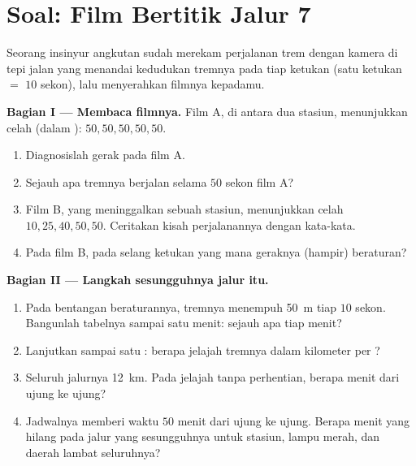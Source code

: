 \section{Soal: Film Bertitik Jalur 7}

\begin{problem}\label{pb:g6:describing-motion:1}
Seorang insinyur angkutan sudah merekam perjalanan trem dengan kamera
di tepi jalan yang menandai kedudukan tremnya pada tiap ketukan (satu
ketukan $=$ $10$ sekon), lalu menyerahkan filmnya kepadamu.

\medskip\noindent\textbf{Bagian I --- Membaca filmnya.}
Film A, di antara dua stasiun, menunjukkan celah (dalam ):
$50, 50, 50, 50, 50$.
\begin{enumerate}
  \item Diagnosislah gerak pada film A.
  \item Sejauh apa tremnya berjalan selama $50$ sekon film A?
  \item Film B, yang meninggalkan sebuah stasiun, menunjukkan celah
        $10, 25, 40, 50, 50$. Ceritakan kisah perjalanannya dengan
        kata-kata.
  \item Pada film B, pada selang ketukan yang mana geraknya (hampir)
        beraturan?
\end{enumerate}

\medskip\noindent\textbf{Bagian II --- Langkah sesungguhnya jalur itu.}
\begin{enumerate}[resume]
  \item Pada bentangan beraturannya, tremnya menempuh \qty{50}{m}
        tiap $10$ sekon. Bangunlah tabelnya sampai satu menit: sejauh
        apa tiap menit?
  \item Lanjutkan sampai satu : berapa  jelajah tremnya
        dalam kilometer per ?
  \item Seluruh jalurnya \qty{12}{km}. Pada  jelajah tanpa
        perhentian, berapa menit dari ujung ke ujung?
  \item Jadwalnya memberi waktu $50$ menit dari ujung ke ujung.
        Berapa menit yang hilang pada jalur yang sesungguhnya untuk
        stasiun, lampu merah, dan daerah lambat seluruhnya?
\end{enumerate}


\end{problem}
